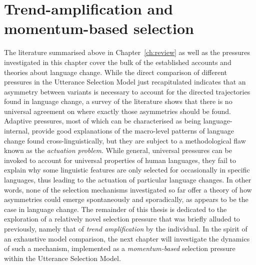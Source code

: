 





\section{Trend-amplification and momentum-based selection}

The literature summarised above in Chapter~\ref{ch:review} as well as the pressures investigated in this chapter cover the bulk of the established accounts and theories about language change.
While the direct comparison of different pressures in the Utterance Selection Model just recapitulated indicates that an asymmetry between variants is necessary to account for the directed trajectories found in language change, a survey of the literature shows that there is no universal agreement on where exactly those asymmetries should be found. Adaptive pressures, most of which can be characterised as being language-internal, provide good explanations of the macro-level patterns of language change found cross-linguistically, but they are subject to a methodological flaw known as the \emph{actuation problem}. 
While general, universal pressures can be invoked to account for universal properties of human languages, they fail to explain why some linguistic features are only selected for occasionally in specific languages, thus leading to the actuation of particular language changes.
In other words, none of the selection mechanisms investigated so far offer a theory of how asymmetries could emerge spontaneously and sporadically, as appears to be the case in language change.
The remainder of this thesis is dedicated to the exploration of a relatively novel selection pressure that was briefly alluded to previously, namely that of \emph{trend amplification} by the individual. In the spirit of an exhaustive model comparison, the next chapter will investigate the dynamics of such a mechanism, implemented as a \emph{momentum-based} selection pressure within the Utterance Selection Model.

